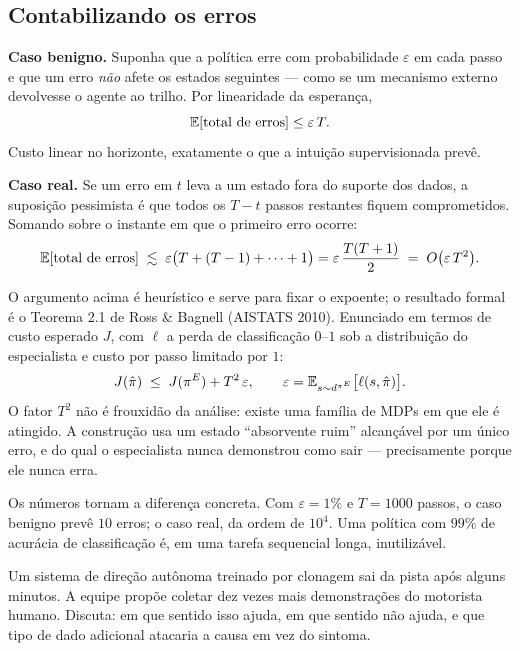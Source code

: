 \documentclass[11pt, a4paper]{article}
\newcommand{\polE}{\pol^{E}}
\begin{document}
\subsection{Contabilizando os erros}

\textbf{Caso benigno.} Suponha que a política erre com probabilidade
$\varepsilon$ em cada passo e que um erro \emph{não} afete os estados seguintes
--- como se um mecanismo externo devolvesse o agente ao trilho. Por linearidade
da esperança,
\[
  \mathbb{E}[\text{total de erros}] \le \varepsilon\, T .
\]
Custo linear no horizonte, exatamente o que a intuição supervisionada prevê.

\textbf{Caso real.} Se um erro em $t$ leva a um estado fora do suporte dos dados,
a suposição pessimista é que todos os $T-t$ passos restantes fiquem
comprometidos. Somando sobre o instante em que o primeiro erro ocorre:
\[
  \mathbb{E}[\text{total de erros}] \;\lesssim\;
  \varepsilon\bigl(T + (T-1) + \dots + 1\bigr)
  = \varepsilon\,\frac{T(T+1)}{2}
  \;=\; O\bigl(\varepsilon\,T^{2}\bigr).
\]

\begin{provabox}
O argumento acima é heurístico e serve para fixar o expoente; o resultado formal
é o Teorema 2.1 de Ross \& Bagnell (AISTATS 2010). Enunciado em termos de custo
esperado $J$, com $\ell$ a perda de classificação $0$--$1$ sob a distribuição do
especialista e custo por passo limitado por $1$:
\[
  J(\hat\pol) \;\le\; J(\polE) + T^{2}\,\varepsilon,
  \qquad \varepsilon = \E_{s\sim d^{\polE}}\bigl[\ell(s,\hat\pol)\bigr].
\]
O fator $T^2$ não é frouxidão da análise: existe uma família de MDPs em que ele
é atingido. A construção usa um estado ``absorvente ruim'' alcançável por um
único erro, e do qual o especialista nunca demonstrou como sair --- precisamente
porque ele nunca erra.
\end{provabox}

Os números tornam a diferença concreta. Com $\varepsilon = 1\%$ e $T = 1000$
passos, o caso benigno prevê $10$ erros; o caso real, da ordem de $10^{4}$. Uma
política com $99\%$ de acurácia de classificação é, em uma tarefa sequencial
longa, inutilizável.

\begin{discbox}
Um sistema de direção autônoma treinado por clonagem sai da pista após alguns
minutos. A equipe propõe coletar dez vezes mais demonstrações do motorista
humano. Discuta: em que sentido isso ajuda, em que sentido não ajuda, e que
tipo de dado adicional atacaria a causa em vez do sintoma.
\end{discbox}
\end{document}
